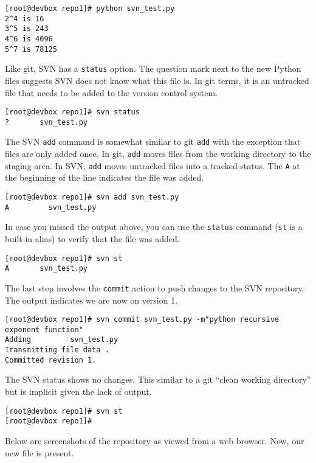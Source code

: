 \begin{verbatim}
[root@devbox repo1]# python svn_test.py 
2^4 is 16
3^5 is 243
4^6 is 4096
5^7 is 78125
\end{verbatim}

Like git, SVN has a \verb|status| option. The question mark next to the new
Python files suggests SVN does not know what this file is. In git terms, it is
an untracked file that needs to be added to the version control system.

\begin{verbatim}
[root@devbox repo1]# svn status
?       svn_test.py
\end{verbatim}

The SVN \verb|add| command is somewhat similar to git \verb|add| with the
exception that files are only added once. In git, \verb|add| moves files from
the working directory to the staging area. In SVN, \verb|add| moves untracked
files into a tracked status. The \verb|A| at the beginning of the line
indicates the file was added.

\begin{verbatim}
[root@devbox repo1]# svn add svn_test.py 
A         svn_test.py
\end{verbatim}

In case you missed the output above, you can use the \verb|status| command
(\verb|st| is a built-in alias) to verify that the file was added.

\begin{verbatim}
[root@devbox repo1]# svn st
A       svn_test.py
\end{verbatim}

The last step involves the \verb|commit| action to push changes to the SVN
repository. The output indicates we are now on version 1.

\begin{verbatim}
[root@devbox repo1]# svn commit svn_test.py -m"python recursive exponent function"
Adding         svn_test.py
Transmitting file data .
Committed revision 1.
\end{verbatim}

The SVN status shows no changes. This similar to a git ``clean working
directory'' but is implicit given the lack of output.

\begin{verbatim}
[root@devbox repo1]# svn st
[root@devbox repo1]#
\end{verbatim}

Below are screenshots of the repository as viewed from a web browser. Now, our
new file is present.

